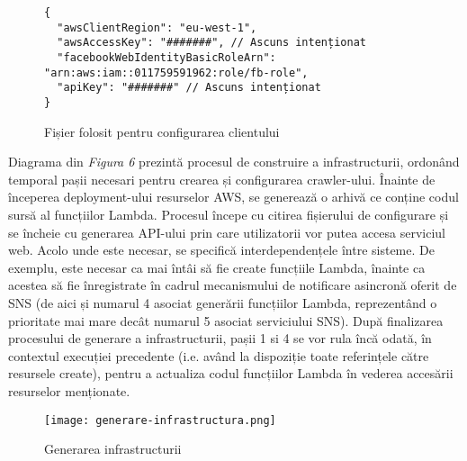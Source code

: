 \begin{figure}[ht]
\begin{verbatim}
{
  "awsClientRegion": "eu-west-1",
  "awsAccessKey": "#######", // Ascuns intenționat
  "facebookWebIdentityBasicRoleArn": "arn:aws:iam::011759591962:role/fb-role",
  "apiKey": "#######" // Ascuns intenționat
}
\end{verbatim}
\begin{center}
	\caption{Fișier folosit pentru configurarea clientului}\par\medskip
	
\end{center}
\end{figure}

\noindent
Diagrama din \textit{Figura 6} prezintă procesul de construire a infrastructurii, ordonând temporal pașii necesari pentru crearea și configurarea crawler-ului. Înainte de începerea deployment-ului resurselor AWS, se generează o arhivă ce conține codul sursă al funcțiilor Lambda. Procesul începe cu citirea fișierului de configurare și se încheie cu generarea API-ului prin care utilizatorii vor putea accesa serviciul web. Acolo unde este necesar, se specifică interdependențele între sisteme. De exemplu, este necesar ca mai întâi să fie create funcțiile Lambda, înainte ca acestea să fie înregistrate în cadrul mecanismului de notificare asincronă oferit de SNS (de aici și numarul 4 asociat generării funcțiilor Lambda, reprezentând o prioritate mai mare decât numarul 5 asociat serviciului SNS). După finalizarea procesului de generare a infrastructurii, pașii 1 si 4 se vor rula încă odată, în contextul execuției precedente (i.e. având la dispoziție toate referințele către resursele create), pentru a actualiza codul funcțiilor Lambda în vederea accesării resurselor menționate.

\begin{figure}[ht]
\begin{center}
	\texttt{[image: generare-infrastructura.png]}
	\caption{Generarea infrastructurii \cite{diagram-icons-sources, aws-icons-source}}\par\medskip 

\end{center}
\end{figure}

 